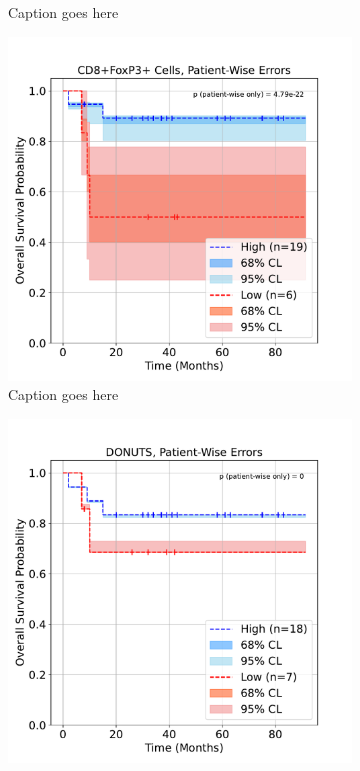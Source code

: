 \documentclass[article]{jss}
\begin{document}
\begin{figure}
\begin{subfigure}[t]{0.49\textwidth}
    \caption{\label{fig:lung-dataset-donuts} Caption goes here}
  \end{subfigure}
  \begin{subfigure}[t]{0.49\textwidth}
    \centering
    \includegraphics{lung_cells_km_OS_patient_wise.pdf}
    \caption{\label{fig:lung-dataset-cells-patient-wise} Caption goes here}
  \end{subfigure}
  \begin{subfigure}[t]{0.49\textwidth}
    \centering
    \includegraphics{lung_donuts_km_OS_patient_wise.pdf}

\end{subfigure}
\end{figure}
\end{document}
